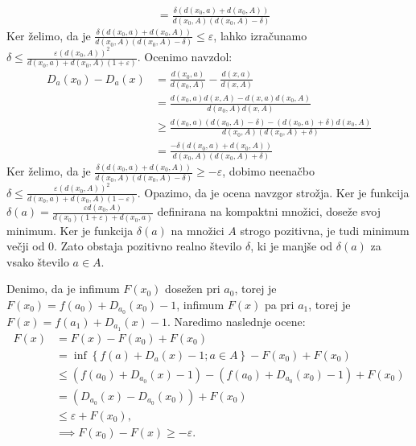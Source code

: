 \documentclass[mat1]{fmfdelo}
\newcommand{\0}{0}
\begin{document}
\begin{dokaz}
\begin{equation*}
\begin{split}
& = \frac{\delta (d(x_0, a) + d(x_0, A))}{d(x_0, A) (d(x_0, A) - \delta)}
\end{split}
\end{equation*}
Ker želimo, da je $\frac{\delta (d(x_0, a) + d(x_0, A))}{d(x_0, A) (d(x_0, A) - \delta)} \leq \varepsilon$, lahko izračunamo $\delta \leq \frac{\varepsilon (d(x_0, A))^2}{d(x_0, a) + d(x_0, A)(1+ \varepsilon)}$.
Ocenimo navzdol:
\begin{equation*}
\begin{split}
D_a(x_0) - D_a(x) & = \frac{d(x_0, a)}{d(x_0, A)} - \frac{d(x, a)}{d(x, A)} \\
& =  \frac{d(x_0, a)d(x, A) - d(x, a)d(x_0, A)}{d(x_0, A) d(x, A)} \\
& \geq \frac{d(x_0, a)(d(x_0, A) - \delta) - (d(x_0, a) + \delta)d(x_0, A)}{d(x_0, A) (d(x_0, A) + \delta)} \\
& = \frac{-\delta (d(x_0, a) + d(x_0, A))}{d(x_0, A) (d(x_0, A) + \delta)}
\end{split}
\end{equation*}
Ker želimo, da je $\frac{\delta (d(x_0, a) + d(x_0, A))}{d(x_0, A) (d(x_0, A) - \delta)} \geq -\varepsilon$, dobimo neenačbo $\delta \leq \frac{\varepsilon (d(x_0, A))^2}{d(x_0, a) + d(x_0, A)(1- \varepsilon)}$.
Opazimo, da je ocena navzgor strožja. Ker je funkcija $\delta(a) = \frac{\varepsilon d(x_0, A)}{d(x_0)(1+ \varepsilon) + d(x_0, a)}$ definirana na kompaktni množici, doseže svoj minimum. Ker je funkcija $\delta(a)$ na množici $A$ strogo pozitivna, je tudi minimum večji od $0$. Zato obstaja pozitivno realno število $\delta$, ki je manjše od $\delta(a)$ za vsako število $a \in A$.


Denimo, da je infimum $F(x_0)$ dosežen pri $a_0$, torej je $F(x_0) = f(a_0) + D_{a_0}(x_0) - 1$, infimum $F(x)$ pa pri $a_1$, torej je $F(x) = f(a_1) + D_{a_1}(x) - 1$. Naredimo naslednje ocene:
\begin{equation*}
\begin{split}
F(x) & = F(x) - F(x_0) + F(x_0) \\
& = \inf \left \{ f(a) + D_a(x) - 1; a \in A \right \} - F(x_0) + F(x_0) \\
& \leq (f(a_0) + D_{a_0}(x) - 1) -  (f(a_0) + D_{a_0}(x_0) - 1) + F(x_0) \\
& = (D_{a_0}(x) -  D_{a_0}(x_0)) + F(x_0) \\
& \leq \varepsilon + F(x_0), \\
& \implies F(x_0) - F(x) \geq -\varepsilon.
\end{split}
\end{equation*}


\end{dokaz}
\end{document}
